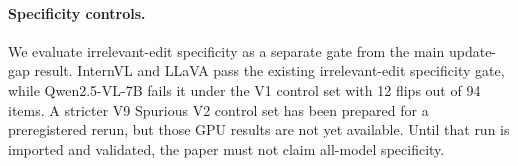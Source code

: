 \paragraph{Specificity controls.}
We evaluate irrelevant-edit specificity as a separate gate from the main update-gap result. InternVL and LLaVA pass the existing irrelevant-edit specificity gate, while Qwen2.5-VL-7B fails it under the V1 control set with 12 flips out of 94 items. A stricter V9 Spurious V2 control set has been prepared for a preregistered rerun, but those GPU results are not yet available. Until that run is imported and validated, the paper must not claim all-model specificity.
